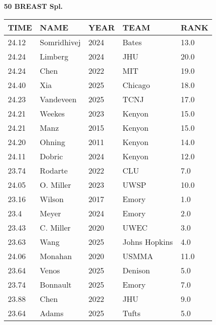 \begin{center}
\begin{minipage}[t]{0.7\textwidth}
\centering
\textbf{50 BREAST Spl.}\\[0.05cm]
\begin{tabular}{@{}p{1.8cm}p{2.8cm}p{1.2cm}p{1.4cm}p{0.8cm}@{}}
\hline
\textbf{TIME} & \textbf{NAME} & \textbf{YEAR} & \textbf{TEAM} & \textbf{RANK} \\
\hline
24.12 & Somridhivej & 2024 & Bates & 13.0 \\
24.24 & Limberg & 2024 & JHU & 20.0 \\
24.24 & Chen & 2022 & MIT & 19.0 \\
24.40 & Xia & 2025 & Chicago & 18.0 \\
24.23 & Vandeveen & 2025 & TCNJ & 17.0 \\
24.21 & Weekes & 2023 & Kenyon & 15.0 \\
24.21 & Manz & 2015 & Kenyon & 15.0 \\
24.20 & Ohning & 2011 & Kenyon & 14.0 \\
24.11 & Dobric & 2024 & Kenyon & 12.0 \\
23.74 & Rodarte & 2022 & CLU & 7.0 \\
24.05 & O. Miller & 2023 & UWSP & 10.0 \\
23.16 & Wilson & 2017 & Emory & 1.0 \\
23.4 & Meyer & 2024 & Emory & 2.0 \\
23.43 & C. Miller & 2020 & UWEC & 3.0 \\
23.63 & Wang & 2025 & Johns Hopkins & 4.0 \\
24.06 & Monahan & 2020 & USMMA & 11.0 \\
23.64 & Venos & 2025 & Denison & 5.0 \\
23.74 & Bonnault & 2025 & Emory & 7.0 \\
23.88 & Chen & 2022 & JHU & 9.0 \\
23.64 & Adams & 2025 & Tufts & 5.0 \\
\hline
\end{tabular}
\end{minipage}
\end{center}

\vspace{0.4cm}

